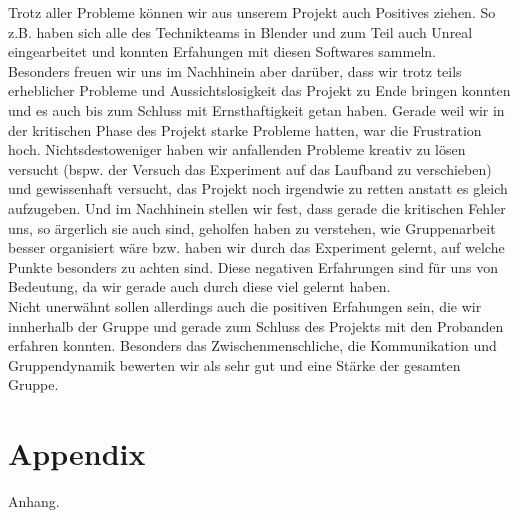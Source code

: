\documentclass{Bericht}
\begin{document}
	Trotz aller Probleme können wir aus unserem Projekt auch Positives ziehen. So z.B. haben sich alle des Technikteams in Blender und zum Teil auch Unreal eingearbeitet und konnten Erfahungen mit diesen Softwares sammeln.\\	
	Besonders freuen wir uns im Nachhinein aber darüber, dass wir trotz teils erheblicher Probleme und Aussichtslosigkeit das Projekt zu Ende bringen konnten und es auch bis zum Schluss mit Ernsthaftigkeit getan haben. Gerade weil wir in der kritischen Phase des Projekt starke Probleme hatten, war die Frustration hoch. Nichtsdestoweniger haben wir anfallenden Probleme kreativ zu lösen versucht (bspw. der Versuch das Experiment auf das Laufband zu verschieben) und gewissenhaft versucht, das Projekt noch irgendwie zu retten anstatt es gleich aufzugeben. Und im Nachhinein stellen wir fest, dass gerade die kritischen Fehler uns, so ärgerlich sie auch sind, geholfen haben zu verstehen, wie Gruppenarbeit besser organisiert wäre bzw. haben wir durch das Experiment gelernt, auf welche Punkte besonders zu achten sind. Diese negativen Erfahrungen sind für uns von Bedeutung, da wir gerade auch durch diese viel gelernt haben.\\ 
Nicht unerwähnt sollen allerdings auch die positiven Erfahungen sein, die wir innherhalb der Gruppe und gerade zum Schluss des Projekts mit den Probanden erfahren konnten. Besonders das Zwischenmenschliche, die Kommunikation und Gruppendynamik bewerten wir als sehr gut und eine Stärke der gesamten Gruppe. 


\section{Appendix} %
	Anhang.
	
\vfill %

\printbibliography
\end{document}
